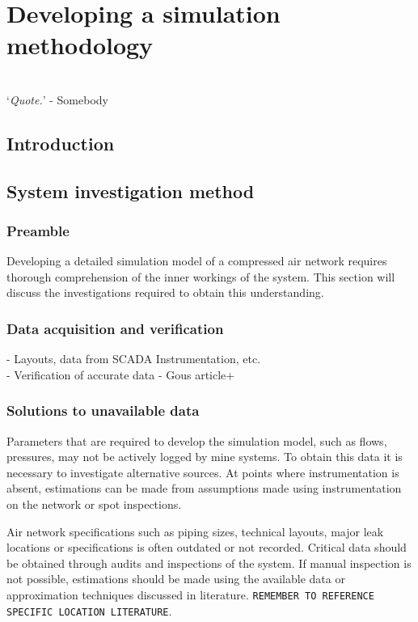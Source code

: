 \chapter{Developing a simulation methodology}
\thispagestyle{empty}
\vspace{38em}
\hrulefill
\\
\enquote*{\textit{Quote.}} - Somebody\\
\newpage
\section{Introduction}
\section{System investigation method}
	\subsection{Preamble}
		Developing a detailed simulation model of a compressed air network requires thorough comprehension of the inner workings of the system. This section will discuss the investigations required to obtain this understanding.
	\subsection{Data acquisition and verification} %
		- Layouts, data from SCADA Instrumentation, etc.\\
		- Verification of accurate data - Gous article+
	\subsection{Solutions to unavailable data}
		Parameters that are required to develop the simulation model, such as flows, pressures, may not be actively logged by mine systems. To obtain this data it is necessary to investigate alternative sources. At points where instrumentation is absent, estimations can be made from assumptions made using instrumentation on the network or spot inspections.
		\par 
		Air network specifications such as piping sizes, technical layouts, major leak locations or specifications is often outdated or not recorded. Critical data should be obtained through audits and inspections of the system. If manual inspection is not possible, estimations should be made using the available data or approximation techniques discussed in literature. \texttt{REMEMBER TO REFERENCE SPECIFIC LOCATION LITERATURE}.

